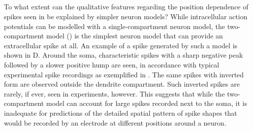 %
%



\subsection{}
\label{sec:Spikes:two-compartment}
To what extent can the qualitative features regarding the position dependence of spikes seen 
in  be explained by simpler neuron models? 
While intracellular  action potentials can be modelled with a single-compartment neuron model, 
the two-compartment model () is the simplest neuron model that can provide an extracellular spike at all. An example of a spike generated by such a model is shown in D. Around the soma, characteristic spikes with a sharp negative peak followed by a slower positive hump are seen, in accordance with typical experimental spike recordings as exemplified in . The same spikes with inverted form are observed outside the dendrite compartment. Such inverted spikes are rarely, if ever, seen in experiments, however. This suggests that while the two-compartment model can account for large spikes recorded next to the soma, it is inadequate for 
predictions of  the detailed spatial pattern of spike shapes that would be recorded by an electrode at different positions around a neuron.   

